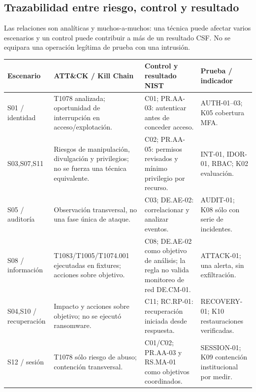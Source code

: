 \documentclass[10pt,a4paper]{article}
\newcommand{\cabecera}[1]{\textbf{#1}}
\begin{document}
\subsection*{Trazabilidad entre riesgo, control y resultado}
Las relaciones son analíticas y muchos-a-muchos: una técnica puede afectar varios escenarios y un control puede contribuir a más de un resultado CSF. No se equipara una operación legítima de prueba con una intrusión.
\begin{TablaCompacta}
\begin{longtable}{P{23mm}P{43mm}P{49mm}P{44mm}}
\toprule\cabecera{Escenario} & \cabecera{ATT\&CK / Kill Chain} & \cabecera{Control y resultado NIST} & \cabecera{Prueba / indicador}\\\midrule\endhead
S01 / identidad & T1078 analizada; oportunidad de interrupción en acceso/explotación. & C01; PR.AA-03: autenticar antes de conceder acceso. & AUTH-01--03; K05 cobertura MFA.\\
S03,S07,S11 & Riesgos de manipulación, divulgación y privilegios; no se fuerza una técnica equivalente. & C02; PR.AA-05: permisos revisados y mínimo privilegio por recurso. & INT-01, IDOR-01, RBAC; K02 evaluación.\\
S05 / auditoría & Observación transversal, no una fase única de ataque. & C03; DE.AE-02: correlacionar y analizar eventos. & AUDIT-01; K08 sólo con serie de incidentes.\\
S08 / información & T1083/T1005/T1074.001 ejecutadas en fixtures; acciones sobre objetivo. & C08; DE.AE-02 como objetivo de análisis; la regla no valida monitoreo de red DE.CM-01. & ATTACK-01; una alerta, sin exfiltración.\\
S04,S10 / recuperación & Impacto y acciones sobre objetivo; no se ejecutó ransomware. & C11; RC.RP-01: recuperación iniciada desde respuesta. & RECOVERY-01; K10 restauraciones verificadas.\\
S12 / sesión & T1078 sólo riesgo de abuso; contención transversal. & C01/C02; PR.AA-03 y RS.MA-01 como objetivos coordinados. & SESSION-01; K09 contención institucional por medir.\\\bottomrule
\end{longtable}
\end{TablaCompacta}
\end{document}
